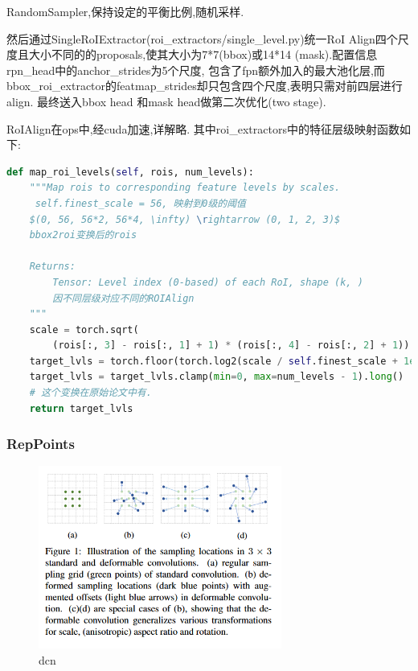 \documentclass[UTF8]{ctexart}
\begin{document}
RandomSampler,保持设定的平衡比例,随机采样.

然后通过SingleRoIExtractor(roi\_extractors/single\_level.py)统一RoI
Align四个尺度且大小不同的的proposals,使其大小为7*7(bbox)或14*14
(mask).配置信息rpn\_head中的anchor\_strides为5个尺度,
包含了fpn额外加入的最大池化层,而bbox\_roi\_extractor的featmap\_strides却只包含四个尺度,表明只需对前四层进行align.
最终送入bbox head 和mask head做第二次优化(two stage).

RoIAlign在ops中,经cuda加速,详解略.
其中roi\_extractors中的特征层级映射函数如下:
\lstset{style=mystyle}
\begin{lstlisting}[language=Python]
	def map_roi_levels(self, rois, num_levels):
	"""Map rois to corresponding feature levels by scales.
	 self.finest_scale = 56, 映射到0级的阈值
	$(0, 56, 56*2, 56*4, \infty) \rightarrow (0, 1, 2, 3)$
	bbox2roi变换后的rois

	Returns:
		Tensor: Level index (0-based) of each RoI, shape (k, )
		因不同层级对应不同的ROIAlign
	"""
	scale = torch.sqrt(
		(rois[:, 3] - rois[:, 1] + 1) * (rois[:, 4] - rois[:, 2] + 1))
	target_lvls = torch.floor(torch.log2(scale / self.finest_scale + 1e-6))
	target_lvls = target_lvls.clamp(min=0, max=num_levels - 1).long()
	# 这个变换在原始论文中有.
	return target_lvls
\end{lstlisting}

\subsubsection{RepPoints}

\begin{figure}[htbp]
	\centering
	\begin{minipage}[t]{0.9\textwidth}
	\centering
	\includegraphics[width=8cm, height=6cm]{./pic/DCN.png}
	\caption{dcn}
	\label{picdcn}
	\end{minipage}
\end{figure}
\end{document}
